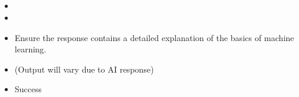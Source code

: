 \documentclass[letterpaper,10pt,english]{sphinxmanual}
\begin{document}
\subsection{}
\label{\detokenize{src/genAITestCases:test-case-test-ai-explain-course-success}}\begin{itemize}
\item {} 
\sphinxAtStartPar
{} 

\item {} 
\sphinxAtStartPar
{}

\begin{sphinxVerbatim}[commandchars=\\\{\}]
\end{sphinxVerbatim}

\item {} 
\sphinxAtStartPar
{}
\sphinxhyphen{} Ensure the response contains a detailed explanation of the basics of machine learning.

\item {} 
\sphinxAtStartPar
{}
\sphinxhyphen{} (Output will vary due to AI response)

\item {} 
\sphinxAtStartPar
{} Success

\end{itemize}
\end{document}
